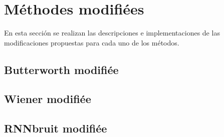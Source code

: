\documentclass[conference,onecolumn]{IEEEtran}
\begin{document}
\clearpage

\section{Méthodes modifiées}
En esta sección se realizan las descripciones e implementaciones de las modificaciones propuestas para cada uno de los métodos.

\subsection{\textbf{Butterworth modifiée}}

\subsection{\textbf{Wiener modifiée}}

\subsection{\textbf{RNNbruit modifiée}}
\end{document}
